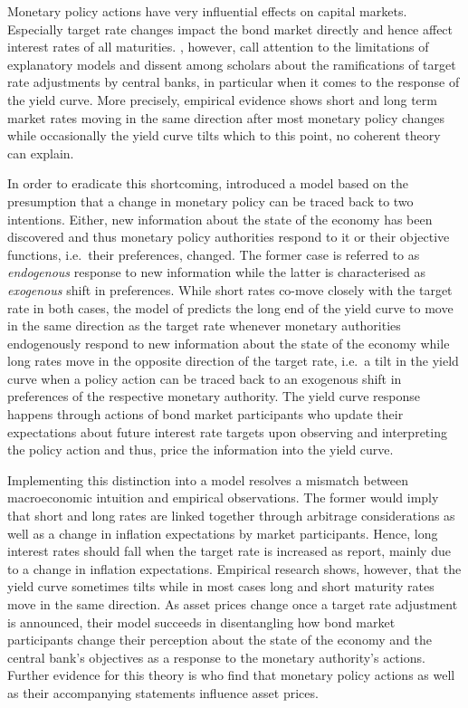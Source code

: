 
Monetary policy actions have very influential effects on capital markets. Especially target rate changes impact the bond market directly and hence affect interest rates of all maturities. \textcite{Ellingsen.2001}, however, call attention to the limitations of explanatory models and dissent among scholars about the ramifications of target rate adjustments by central banks, in particular when it comes to the response of the yield curve. More precisely, empirical evidence shows short and long term market rates moving in the same direction after most monetary policy changes while occasionally the yield curve tilts which to this point, no coherent theory can explain.

In order to eradicate this shortcoming, \textcite{Ellingsen.2001} introduced a model based on the presumption that a change in monetary policy can be traced back to two intentions. Either, new information about the state of the economy has been discovered and thus monetary policy authorities respond to it or their objective functions, i.e.~their preferences, changed. The former case is referred to as \textit{endogenous} response to new information while the latter is characterised as \textit{exogenous} shift in preferences. While short rates co-move closely with the target rate in both cases, the model of \textcite{Ellingsen.2001} predicts the long end of the yield curve to  move in the same direction as the target rate whenever monetary authorities endogenously respond to new information about the state of the economy while long rates move in the opposite direction of the target rate, i.e.~a tilt in the yield curve when a policy action can be traced back to an exogenous shift in preferences of the respective monetary authority. The yield curve response happens through actions of bond market participants who update their expectations about future interest rate targets upon observing and interpreting the policy action and thus, price the information into the yield curve. 

Implementing this distinction into a model resolves a mismatch between macroeconomic intuition and empirical observations. The former would imply that short and long rates are linked together through arbitrage considerations as well as a change in inflation expectations by market participants. Hence, long interest rates should fall when the target rate is increased as \textcite{Ellingsen.2003} report, mainly due to a change in inflation expectations. Empirical research shows, however, that the yield curve sometimes tilts while in most cases long and short maturity rates move in the same direction. As asset prices change once a target rate adjustment is announced, their model succeeds in disentangling how bond market participants change their perception about the state of the economy and the central bank's objectives as a response to the monetary authority's actions. Further evidence for this theory is \textcite{Gurkaynak.2004} who find that monetary policy actions as well as their accompanying statements influence asset prices.

